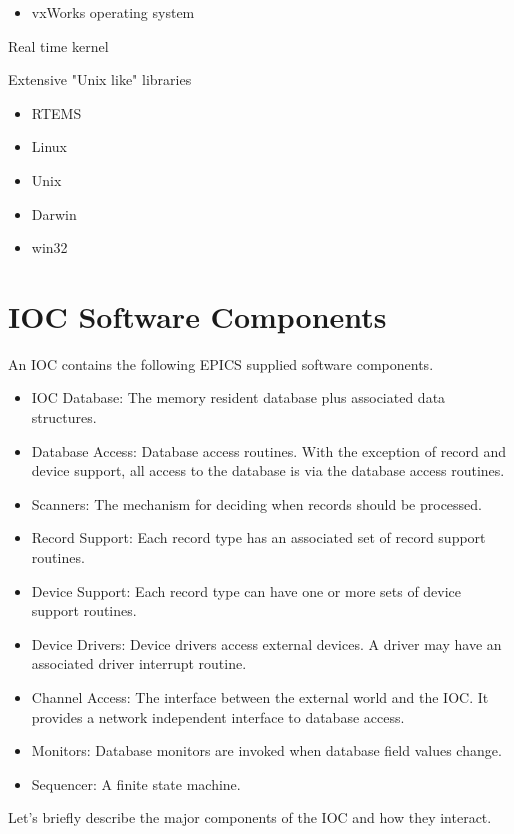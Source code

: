 \begin{itemize}\item vxWorks operating system

\end{itemize}Real time kernel

Extensive "Unix like" libraries

\begin{itemize}\item RTEMS

\item Linux

\item Unix

\item Darwin

\item win32

\end{itemize}\section{IOC Software Components}

An IOC contains the following EPICS supplied software components.

\begin{itemize}\item IOC Database: The memory resident database plus associated data structures.

\item Database Access:  Database access routines. With the exception of record and device support, all access to the 
database is via the database access routines.

\item Scanners:  The mechanism for deciding when records should be processed.

\item Record Support:  Each record type has an associated set of record support routines.

\item Device Support: Each record type can have one or more sets of device support routines.

\item Device Drivers:  Device drivers access external devices. A driver may have an associated driver interrupt routine.

\item Channel Access:  The interface between the external world and the IOC. It provides a network independent 
interface to database access.

\item Monitors:  Database monitors are invoked when database field values change.

\item Sequencer:  A finite state machine.

\end{itemize}Let's briefly describe the major components of the IOC and how they interact.

